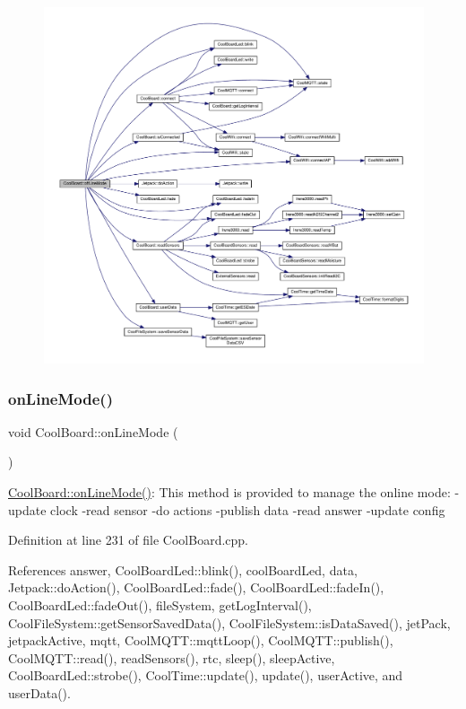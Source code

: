 \begin{figure}[H]
\begin{center}
\leavevmode
\includegraphics[width=350pt]{classCoolBoard_ae6b5e1274d760462290192acea4adca8_cgraph}
\end{center}
\end{figure}
\mbox{\label{classCoolBoard_aa0bbc4bc605e35618d18e68795c61363}} 
\subsubsection{\texorpdfstring{on\+Line\+Mode()}{onLineMode()}}
{\footnotesize\ttfamily void Cool\+Board\+::on\+Line\+Mode (\begin{DoxyParamCaption}{ }\end{DoxyParamCaption})}

\hyperlink{classCoolBoard_aa0bbc4bc605e35618d18e68795c61363}{Cool\+Board\+::on\+Line\+Mode()}\+: This method is provided to manage the online mode\+: -\/update clock -\/read sensor -\/do actions -\/publish data -\/read answer -\/update config 

Definition at line 231 of file Cool\+Board.\+cpp.



References answer, Cool\+Board\+Led\+::blink(), cool\+Board\+Led, data, Jetpack\+::do\+Action(), Cool\+Board\+Led\+::fade(), Cool\+Board\+Led\+::fade\+In(), Cool\+Board\+Led\+::fade\+Out(), file\+System, get\+Log\+Interval(), Cool\+File\+System\+::get\+Sensor\+Saved\+Data(), Cool\+File\+System\+::is\+Data\+Saved(), jet\+Pack, jetpack\+Active, mqtt, Cool\+M\+Q\+T\+T\+::mqtt\+Loop(), Cool\+M\+Q\+T\+T\+::publish(), Cool\+M\+Q\+T\+T\+::read(), read\+Sensors(), rtc, sleep(), sleep\+Active, Cool\+Board\+Led\+::strobe(), Cool\+Time\+::update(), update(), user\+Active, and user\+Data().


